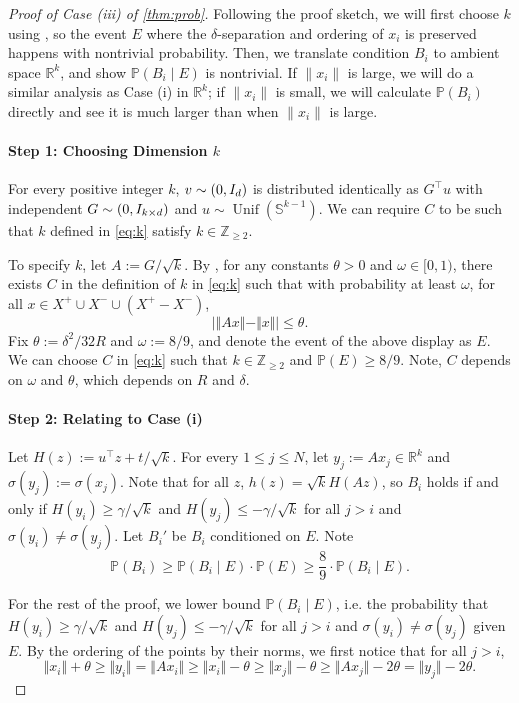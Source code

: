 \documentclass[aoap]{imsart}
\numberwithin{equation}{section}
\theoremstyle{definition}
\theoremstyle{remark}
\newcommand{\N}{\mathbb{N}}
\newcommand{\R}{\mathbb{R}} %
\newcommand{\Z}{\mathbb{Z}} %
\numberwithin{equation}{section}
\renewcommand{\S}{\mathbb{S}}
\newcommand{\0}{\mathbf{0}}
\newcommand{\1}{\mathbf{1}}
\renewcommand{\P}{\mathbb{P}}
\renewcommand{\S}{\mathbb{S}}
\DeclareMathOperator{\Unif}{Unif}
\let \N \relax
\DeclareMathOperator{\N}{N}
\numberwithin{equation}{section}
\begin{document}
\begin{proof}[Proof of Case (iii) of \cref{thm:prob}]
Following the proof sketch, we will first choose $k$ using \cite[Exercise 9.1.8]{Ver18}, so the event $E$ where the $\delta$-separation and ordering of $x_i$ is preserved happens with nontrivial probability. Then, we translate condition $B_i$ to ambient space $\mathbb{R}^k$, and show $\mathbb{P}(B_i\mid E)$ is nontrivial. If $\|x_i\|$ is large, we will do a similar analysis as Case (i) in $\R^k$; if $\|x_i\|$ is small, we will calculate $\P(B_i)$ directly and see it is much larger than when $\|x_i\|$ is large.

\paragraph{Step 1: Choosing Dimension $k$}
For every positive integer $k$, $v\sim \N(0, I_d)$ is distributed identically as $G^{\intercal}u$ with independent $G\sim \N(0, I_{k\times d})$ and $u\sim \Unif(\S^{k-1})$. We can require $C$ to be such that $k$ defined in \eqref{eq:k} satisfy $k\in\Z_{\geq 2}$.

To specify $k$, let $A:=G/\sqrt{k}$. By \cite[Exercise 9.1.8]{Ver18}, for any constants $\theta >0$ and $\omega\in [0,1)$, there exists $C$ in the definition of $k$ in \eqref{eq:k} such that with probability at least $\omega$, for all $x\in X^+\cup X^-\cup (X^+-X^-)$,
\begin{equation}\label{eq:E}
    \vert \Vert Ax\Vert - \Vert x\Vert \vert \leq \theta.
\end{equation}
Fix $\theta:= {\delta^2}/{32R}$ and $\omega:= 8/9$, and denote the event of the above display as $E$. We can choose $C$ in \eqref{eq:k} such that $k\in\Z_{\geq 2}$ and $\P(E)\geq 8/9$. Note, $C$ depends on $\omega$ and $\theta$, which depends on $R$ and $\delta$.

\paragraph{Step 2: Relating to Case (i)}
Let $H(z):=u^{\intercal}z+t/\sqrt{k}$. For every $1\leq j\leq N$, let $y_j:=Ax_j\in\R^k$ and $\sigma (y_j):=\sigma (x_j)$. Note that for all $z$, $h(z) = \sqrt{k} H(Az)$, so $B_i$ holds if and only if $H(y_i)\geq \gamma/\sqrt{k}$ and $H(y_j)\leq -\gamma/\sqrt{k}$ for all $j>i$ and $\sigma(y_i)\neq \sigma(y_j)$. Let $B_i'$ be $B_i$ conditioned on $E$. Note
\[\P(B_i)\geq \P(B_i\mid E)\cdot \P(E) \geq \frac{8}{9} \cdot \P(B_i\mid E).\]

For the rest of the proof, we lower bound $\P(B_i\mid E)$, i.e. the probability that $H(y_i)\geq \gamma/\sqrt{k}$ and $H(y_j)\leq -\gamma/\sqrt{k}$ for all $j>i$ and $\sigma(y_i)\neq \sigma(y_j)$ given $E$. By the ordering of the points by their norms, we first notice that for all $j>i$, 
\begin{equation}\label{eq:norms}
    \Vert x_i\Vert +\theta \geq \Vert y_i\Vert = \Vert Ax_i\Vert \geq  \Vert x_i\Vert  -\theta \geq  \Vert x_j\Vert-\theta \geq \Vert Ax_j\Vert -2\theta =\Vert y_j\Vert-2\theta.
\end{equation}


\end{proof}
\end{document}
